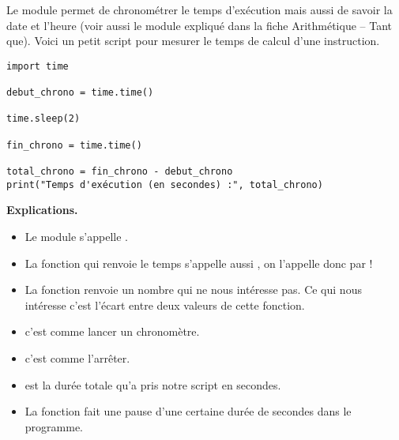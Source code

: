 \documentclass[11pt,class=report,crop=false]{standalone}
\begin{document}
\begin{cours}[Chronomètre]


Le module  permet de chronométrer le temps d'exécution mais aussi de savoir la date et l'heure (voir aussi le module  expliqué dans la fiche \og{}Arithmétique -- Tant que\fg{}).
Voici un petit script pour mesurer le temps de calcul d'une instruction. 

\begin{lstlisting}
import time

debut_chrono = time.time()

time.sleep(2)

fin_chrono = time.time()

total_chrono = fin_chrono - debut_chrono
print("Temps d'exécution (en secondes) :", total_chrono)
\end{lstlisting}


\textbf{Explications.}
\begin{itemize}
  \item Le module s'appelle .
  \item La fonction qui renvoie le temps s'appelle aussi , on l'appelle donc par  !
  \item La fonction  renvoie un nombre qui ne nous intéresse pas. Ce qui nous intéresse c'est l'écart entre deux valeurs de cette fonction. 
  \item {} c'est comme lancer un chronomètre.
  \item {} c'est comme l'arrêter.
  \item {} est la durée totale qu'a pris notre script en secondes.
  \item La fonction  fait une pause d'une certaine durée de secondes dans le programme.
\end{itemize}
\end{cours}


\end{document}
